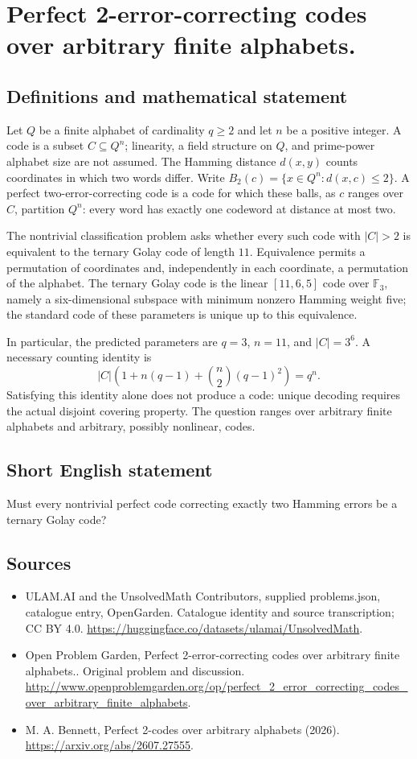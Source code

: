 \documentclass[11pt,a4paper]{article}
\begin{document}
\section*{Perfect 2-error-correcting codes over arbitrary finite alphabets.}\label{statement}

\subsection{Definitions and mathematical statement}
Let $Q$ be a finite alphabet of cardinality $q\ge2$ and let $n$ be a positive integer. A code is a subset $C\subseteq Q^n$; linearity, a field structure on $Q$, and prime-power alphabet size are not assumed. The Hamming distance $d(x,y)$ counts coordinates in which two words differ. Write $B_2(c)=\{x\in Q^n:d(x,c)\le2\}$. A perfect two-error-correcting code is a code for which these balls, as $c$ ranges over $C$, partition $Q^n$: every word has exactly one codeword at distance at most two.

The nontrivial classification problem asks whether every such code with $|C|>2$ is equivalent to the ternary Golay code of length $11$. Equivalence permits a permutation of coordinates and, independently in each coordinate, a permutation of the alphabet. The ternary Golay code is the linear $[11,6,5]$ code over $\mathbb F_3$, namely a six-dimensional subspace with minimum nonzero Hamming weight five; the standard code of these parameters is unique up to this equivalence.

In particular, the predicted parameters are $q=3$, $n=11$, and $|C|=3^6$. A necessary counting identity is
\[
 |C|\left(1+n(q-1)+\binom n2(q-1)^2\right)=q^n.
\]
Satisfying this identity alone does not produce a code: unique decoding requires the actual disjoint covering property. The question ranges over arbitrary finite alphabets and arbitrary, possibly nonlinear, codes.
\subsection{Short English statement}
Must every nontrivial perfect code correcting exactly two Hamming errors be a ternary Golay code?
\subsection{Sources}
\begin{itemize}
\item[S1] ULAM.AI and the UnsolvedMath Contributors, supplied problems.json, catalogue entry, OpenGarden. Catalogue identity and source transcription; CC BY 4.0.
\url{https://huggingface.co/datasets/ulamai/UnsolvedMath}.
\item[S2] Open Problem Garden, Perfect 2-error-correcting codes over arbitrary finite alphabets.. Original problem and discussion.
\url{http://www.openproblemgarden.org/op/perfect_2_error_correcting_codes_over_arbitrary_finite_alphabets}.
\item[S3] M. A. Bennett, Perfect 2-codes over arbitrary alphabets (2026).
\url{https://arxiv.org/abs/2607.27555}.
\end{itemize}
\end{document}
